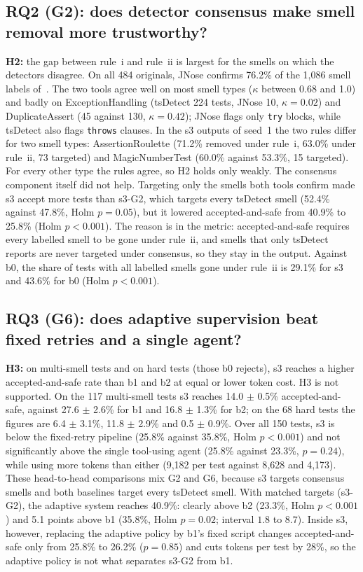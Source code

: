 \subsection{RQ2 (G2): does detector consensus make smell removal more trustworthy?}
\textbf{H2:} the gap between rule~i and rule~ii is largest for the smells on which the detectors disagree.
On all 484 originals, JNose confirms 76.2\% of the 1{,}086 smell labels of~\cite{utrefactor}. The two tools agree well on most smell types ($\kappa$ between 0.68 and 1.0) and badly on ExceptionHandling (tsDetect 224 tests, JNose 10, $\kappa=0.02$) and DuplicateAssert (45 against 130, $\kappa=0.42$); JNose flags only \texttt{try} blocks, while tsDetect also flags \texttt{throws} clauses.
In the \textsf{s3} outputs of seed~1 the two rules differ for two smell types: AssertionRoulette (71.2\% removed under rule~i, 63.0\% under rule~ii, 73 targeted) and MagicNumberTest (60.0\% against 53.3\%, 15 targeted). For every other type the rules agree, so H2 holds only weakly.
The consensus component itself did not help. Targeting only the smells both tools confirm made \textsf{s3} accept more tests than \textsf{s3-G2}, which targets every tsDetect smell (52.4\% against 47.8\%, Holm $p=0.05$), but it lowered accepted-and-safe from 40.9\% to 25.8\% (Holm $p<0.001$).
The reason is in the metric: accepted-and-safe requires every labelled smell to be gone under rule~ii, and smells that only tsDetect reports are never targeted under consensus, so they stay in the output. Against \textsf{b0}, the share of tests with all labelled smells gone under rule~ii is 29.1\% for \textsf{s3} and 43.6\% for \textsf{b0} (Holm $p<0.001$).

\subsection{RQ3 (G6): does adaptive supervision beat fixed retries and a single agent?}
\textbf{H3:} on multi-smell tests and on hard tests (those \textsf{b0} rejects), \textsf{s3} reaches a higher accepted-and-safe rate than \textsf{b1} and \textsf{b2} at equal or lower token cost.
H3 is not supported. On the 117 multi-smell tests \textsf{s3} reaches 14.0 $\pm$ 0.5\% accepted-and-safe, against 27.6 $\pm$ 2.6\% for \textsf{b1} and 16.8 $\pm$ 1.3\% for \textsf{b2}; on the 68 hard tests the figures are 6.4 $\pm$ 3.1\%, 11.8 $\pm$ 2.9\% and 0.5 $\pm$ 0.9\%.
Over all 150 tests, \textsf{s3} is below the fixed-retry pipeline (25.8\% against 35.8\%, Holm $p<0.001$) and not significantly above the single tool-using agent (25.8\% against 23.3\%, $p=0.24$), while using more tokens than either (9{,}182 per test against 8{,}628 and 4{,}173).
These head-to-head comparisons mix G2 and G6, because \textsf{s3} targets consensus smells and both baselines target every tsDetect smell. With matched targets (\textsf{s3-G2}), the adaptive system reaches 40.9\%: clearly above \textsf{b2} (23.3\%, Holm $p<0.001$) and 5.1 points above \textsf{b1} (35.8\%, Holm $p=0.02$; interval $1.8$ to $8.7$). Inside \textsf{s3}, however, replacing the adaptive policy by \textsf{b1}'s fixed script changes accepted-and-safe only from 25.8\% to 26.2\% ($p=0.85$) and cuts tokens per test by 28\%, so the adaptive policy is not what separates \textsf{s3-G2} from \textsf{b1}.

